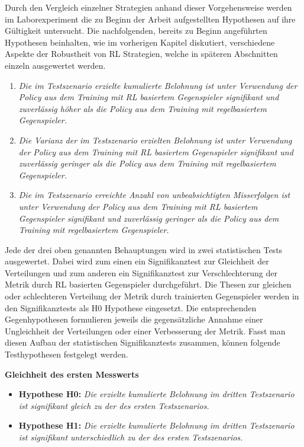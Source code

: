 Durch den Vergleich einzelner Strategien anhand dieser Vorgehensweise werden im Laborexperiment die zu Beginn der Arbeit aufgestellten Hypothesen auf ihre Gültigkeit untersucht.
Die nachfolgenden, bereits zu Beginn angeführten Hypothesen beinhalten, wie im vorherigen Kapitel diskutiert, verschiedene Aspekte der Robustheit von RL Strategien, welche in späteren Abschnitten einzeln ausgewertet werden.
\begin{enumerate}
    \item \textit{Die im Testszenario erzielte kumulierte Belohnung ist unter Verwendung der Policy aus dem Training mit RL basiertem Gegenspieler signifikant und zuverlässig höher als die Policy aus dem Training mit regelbasiertem Gegenspieler.}
    \item \textit{Die Varianz der im Testszenario erzielten Belohnung ist unter Verwendung der Policy aus dem Training mit RL basiertem Gegenspieler signifikant und zuverlässig geringer als die Policy aus dem Training mit regelbasiertem Gegenspieler.}
    \item \textit{Die im Testszenario erreichte Anzahl von unbeabsichtigten Misserfolgen ist unter Verwendung der Policy aus dem Training mit RL basiertem Gegenspieler signifikant und zuverlässig geringer als die Policy aus dem Training mit regelbasiertem Gegenspieler.}
\end{enumerate}

Jede der drei oben genannten Behauptungen wird in zwei statistischen Tests ausgewertet.
Dabei wird zum einen ein Signifikanztest zur Gleichheit der Verteilungen und zum anderen ein Signifikanztest zur Verschlechterung der Metrik durch RL basierten Gegenspieler durchgeführt.
Die Thesen zur gleichen oder schlechteren Verteilung der Metrik durch trainierten Gegenspieler werden in den Signifikanztests als H0 Hypothese eingesetzt.
Die entsprechenden Gegenhypothesen formulieren jeweils die gegensätzliche Annahme einer Ungleichheit der Verteilungen oder einer Verbesserung der Metrik. 
Fasst man diesen Aufbau der statistischen Signifikanztests zusammen, können folgende Testhypothesen festgelegt werden. 

\textbf{Gleichheit des ersten Messwerts}
\begin{itemize}
    \item \textbf{Hypothese H0:} \textit{Die erzielte kumulierte Belohnung im dritten Testszenario ist signifikant gleich zu der des ersten Testszenarios.}
    \item \textbf{Hypothese H1:} \textit{Die erzielte kumulierte Belohnung im dritten Testszenario ist signifikant unterschiedlich zu der des ersten Testszenarios.}
\end{itemize}


